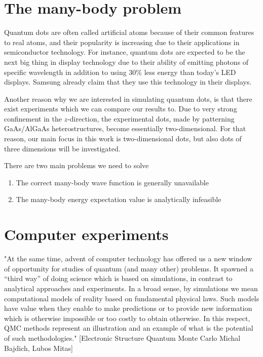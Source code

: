 \section{The many-body problem}


Quantum dots are often called artificial atoms because of their common features to real atoms, and their popularity is increasing due to their applications in semiconductor technology. For instance, quantum dots are expected to be the next big thing in display technology due to their ability of emitting photons of specific wavelength in addition to using 30\% less energy than today's LED displays.\cite{manders_8.3:_2015} Samsung already claim that they use this technology in their displays.\cite{noauthor_2019_nodate}

Another reason why we are interested in simulating quantum dots, is that there exist experiments which we can compare our results to. Due to very strong confinement in the $z$-direction, the experimental dots, made by patterning GaAs/AlGaAs heterostructures, become essentially two-dimensional. \cite{marzin_photoluminescence_1994}\cite{brunner_sharp-line_1994} For that reason, our main focus in this work is two-dimensional dots, but also dots of three dimensions will be investigated.

There are two main problems we need to solve
\begin{enumerate}
	\item The correct many-body wave function is generally unavailable
	\item The many-body energy expectation value is analytically infeasible
\end{enumerate}

\section{Computer experiments}
"At the same time, advent of computer technology has
offered us a new window of opportunity for studies of quantum (and many other) problems. It
spawned a “third way” of doing science which is based on simulations, in contrast to analytical
approaches and experiments. In a broad sense, by simulations we mean computational models of
reality based on fundamental physical laws. Such models have value when they enable to make
predictions or to provide new information which is otherwise impossible or too costly to obtain
otherwise. In this respect, QMC methods represent an illustration and an example of what is the
potential of such methodologies." [Electronic Structure Quantum Monte Carlo Michal Bajdich, Lubos Mitas]  

